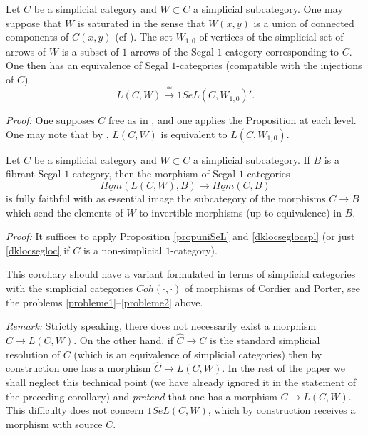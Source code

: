 \begin{corollary}
\label{dklocseglocspl}
Let $C$ be a simplicial category and $W\subset C$ a simplicial subcategory.
One may suppose that $W$ is saturated in the sense that $W(x,y)$ is
a union of connected components of $C(x,y)$ (cf \cite{DwyerKan1}).
The set $W_{1,0}$ of vertices
of the simplicial set of arrows of $W$ is a subset of
$1$-arrows of the Segal $1$-category corresponding to $C$. One then has
an
equivalence of Segal $1$-categories (compatible with the injections of
$C$)
$$
L(C,W) \stackrel{\cong}{\rightarrow} 1SeL(C,W_{1,0})'.
$$
\end{corollary}
{\em Proof:}
One supposes $C$ free as in \cite{DwyerKan1}, and one applies the
Proposition
at each level. One may note that by \cite{DwyerKan1}, $L(C,W)$ is
equivalent to $L(C, W_{1,0})$.
\eop

\begin{corollary}
\label{propunivM}
Let $C$ be a simplicial category and $W\subset C$ a simplicial subcategory.
If $B$ is a fibrant Segal $1$-category, then
the morphism of Segal $1$-categories
$$
\underline{Hom}(L(C,W), B)\rightarrow \underline{Hom}(C,B)
$$
is fully faithful with as essential image the
subcategory of the morphisms $C\rightarrow B$ which send
the elements of $W$ to
invertible morphisms (up to equivalence) in $B$.
\end{corollary}
{\em Proof:}
It suffices
to apply Proposition \ref{propuniSeL} and \ref{dklocseglocspl} (or just
\ref{dklocsegloc} if $C$ is a non-simplicial $1$-category).
\eop

This corollary should have a variant formulated in terms of
simplicial categories with the simplicial categories
$Coh(\cdot , \cdot )$ of morphisms of Cordier and Porter, see the problems
\ref{probleme1}--\ref{probleme2} above.

{\em Remark:} Strictly speaking, there does not necessarily exist a morphism
$C\rightarrow L(C,W)$. On the other hand, if $\widehat{C}\rightarrow C$
is the standard
simplicial resolution of $C$ (which is an equivalence of simplicial
categories) then by construction \cite{DwyerKan1} one has a morphism
$\widehat{C}\rightarrow L(C,W)$. In the rest of the paper we shall
neglect
this technical point (we have already ignored it in the statement of the
preceding corollary) and {\em pretend} that one has a morphism
$C\rightarrow L(C,W)$.
This difficulty does not concern $1SeL(C,W)$,
which by construction receives
a morphism with source $C$.

\bigskip



